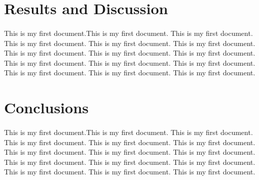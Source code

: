 \documentclass{article}
\begin{document}
	\section{Results and Discussion}
		\paragraph{}
	
	This is my first document.This is my first document. This is my first document. This is my first document. This is my first document. This is my first document. This is my first document. This is my first document. This is my first document. This is my first document. This is my first document. This is my first document. This is my first document. This is my first document. This is my first document.
	
	\section{Conclusions}
		\paragraph{}
	
	 This is my first document.This is my first document. This is my first document. This is my first document. This is my first document. This is my first document. This is my first document. This is my first document. This is my first document. This is my first document. This is my first document. This is my first document. This is my first document. This is my first document. This is my first document.
	 
\end{document}

